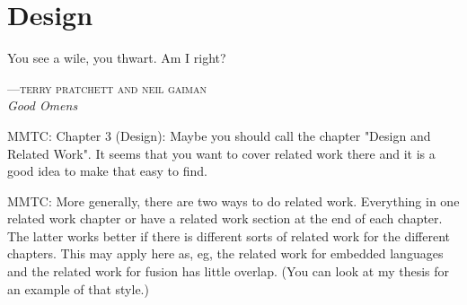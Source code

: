 %
%
%
%

\chapter{Design}
\epigraph{You see a wile, you thwart. Am I right?}%
{\textsc{---terry pratchett and neil gaiman}\\\textit{Good Omens}}

MMTC: Chapter 3 (Design): Maybe you should call the chapter "Design and Related Work". It seems that you want to cover related work there and it is a good idea to make that easy to find.

MMTC: More generally, there are two ways to do related work. Everything in one related work chapter or have a related work section at the end of each chapter. The latter works better if there is different sorts of related work for the different chapters. This may apply here as, eg, the related work for embedded languages and the related work for fusion has little overlap. (You can look at my thesis for an example of that style.)


